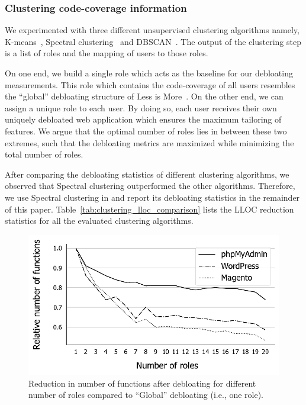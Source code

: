 \subsubsection{Clustering code-coverage information} We experimented with three different unsupervised clustering algorithms namely, K-means~\cite{Jin2010}, Spectral clustering~\cite{spectralclustering} and DBSCAN~\cite{dbscan}.
The output of the clustering step is a list of roles and the mapping of users to those roles.  

On one end, we build a single role which acts as the baseline for our debloating measurements. 
This role which contains the code-coverage of all users resembles the ``global'' debloating structure of Less is More~\cite{lessismore}. 
On the other end, we can assign a unique role to each user. 
By doing so, each user receives their own uniquely debloated web application which ensures the maximum tailoring of features. 
We argue that the optimal number of roles lies in between these two extremes, such that the debloating metrics are maximized while minimizing the total number of roles. 


After comparing the debloating statistics of different clustering algorithms, we observed that Spectral clustering outperformed the other algorithms. Therefore, we use Spectral clustering in \dbltr{} and report its debloating statistics in the remainder of this paper. 
Table~\ref{tab:clustering_lloc_comparison} lists the LLOC reduction statistics for all the evaluated clustering algorithms.

\begin{figure}[]
    \centering
    \includegraphics[width=\linewidth]{figures/dbltr/optimalroles_bw.pdf}
    \caption{Reduction in number of functions after debloating for different number of roles compared to ``Global'' debloating (i.e., one role).}
    \label{fig:optimalroles}
\end{figure}

